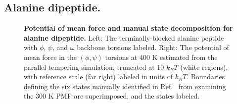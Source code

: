 \subsection{Alanine dipeptide.}


\begin{figure}[tb]
  \begin{center}
  \end{center}
  \caption{{\bf Potential of mean force and manual state decomposition for alanine dipeptide.}  
  Left: The terminally-blocked alanine peptide with $\phi$, $\psi$, and $\omega$ backbone torsions labeled.  
  Right: The potential of mean force in the $(\phi,\psi)$ torsions at 400 K estimated from the parallel tempering simulation, truncated at 10 $k_B T$ (white regions), with reference scale (far right) labeled in units of $k_B T$.  
  Boundaries defining the six states manually identified in Ref.\ \cite{chodera:mms:2006} from examining the 300 K PMF are superimposed, and the states labeled.}
  \label{figure:alanine-dipeptide-2d-pmf}
\end{figure}

